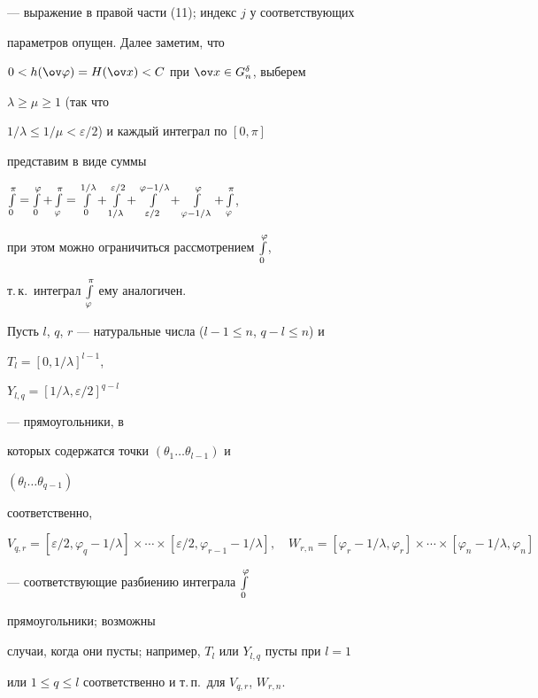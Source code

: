 --- выражение в правой части (11); индекс $j$ у соответствующих 


параметров опущен. Далее заметим, что 


$0<h(\ov\varphi)=H(\ov x)<C$ при $\ov x\in G^\delta_n$, выберем 


$\lambda\ge\mu\ge 1$ (так что 


$1/\lambda\le1/\mu<\varepsilon/2$) и каждый интеграл по $[0,\pi]$ 


представим в виде суммы 


$\intl^\pi_0=\intl^\varphi_0+\intl^\pi_\varphi= 


\intl^{1/\lambda}_0+\intl^{\varepsilon/2}_{1/\lambda}+ 


\intl^{\varphi-1/\lambda}_{\varepsilon/2}+ 


\intl^\varphi_{\varphi-1/\lambda}+\intl^\pi_\varphi$, 


при этом можно ограничиться рассмотрением $\int\limits^\varphi_0$, 


т.\,к.~интеграл $\int\limits^\pi_\varphi$ ему аналогичен. 


Пусть $l$, $q$, $r$ --- натуральные числа ($l-1\le n$, $q-l\le n$) и 


$T_l=[0,1/\lambda]^{l-1}$, 


$Y_{l,q}=[1/\lambda,\varepsilon/2]^{q-l}$ 


--- прямоугольники, в 


которых содержатся точки $(\theta_1\dotsc\theta_{l-1})$ и 


$(\theta_l\dotsc\theta_{q-1})$ 


соответственно, 


$$ 


V_{q,r}=[\varepsilon/2,\varphi_q-1/\lambda]\times\dotsb\times 


[\varepsilon/2,\varphi_{r-1}-1/\lambda],\quad 


W_{r,n}=[\varphi_r-1/\lambda,\varphi_r]\times\dotsb\times 


[\varphi_n-1/\lambda,\varphi_n] 


$$ 


--- соответствующие разбиению интеграла $\int\limits^\varphi_0$ 


прямоугольники; возможны 


случаи, когда они пусты; например, $T_l$ или $Y_{l,q}$ пусты при $l=1$ 


или $1\le q\le l$ соответственно и т.\,п.~для $V_{q,r}$, $W_{r,n}$. 


 


